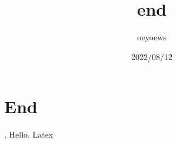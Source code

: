 \documentclass[UTF8]{article}
\title{end \emoji{rocket}}
\author{oeyoews}
\date{2022/08/12}
\begin{document}
\maketitle

\section{End }%
\label{sec:emoji}

, Hello, Latex
\end{document}
